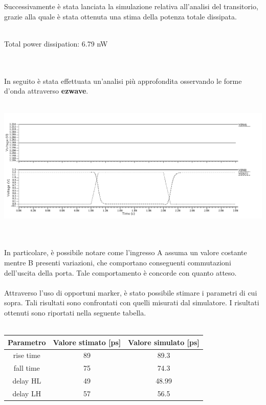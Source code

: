 \documentclass[11pt,  english, makeidx, a4paper, titlepage, oneside]{book}
\newenvironment{listato}{\footnotesize} {\normalsize }
\begin{document}
\begin{center}
\begin{listato}
	\centerline{}
\end{listato}
\end{center}
\vspace{0.3cm}
Successivamente è stata lanciata la simulazione relativa all'analisi del transitorio, grazie alla quale è stata ottenuta una stima della potenza totale dissipata.
\\\\
\centerline{Total power dissipation: 6.79 nW}
\\\\
In seguito è stata effettuata un'analisi più approfondita osservando le forme d'onda attraverso \textbf{ezwave}.
\\\\
\centerline{\includegraphics[width=14cm]{./img/Lab_5/waveform_1.png}}
\\\\
In particolare, è possibile notare come l'ingresso A assuma un valore costante mentre B presenti variazioni, che comportano conseguenti commutazioni dell'uscita della porta. Tale comportamento è concorde con quanto atteso.
\\\\
Attraverso l'uso di opportuni marker, è stato possibile stimare i parametri di cui sopra. Tali risultati sono confrontati con quelli misurati dal simulatore. I risultati ottenuti sono riportati nella seguente tabella.
\\\\
\begin{center}
	\begin{tabular}{|c|c|c|}
	\hline
	Parametro & Valore stimato [ps] & Valore simulato [ps] \\
	\hline
	 rise time & 89 &  89.3 \\
	\hline
	 fall time & 75 & 74.3 \\
	\hline
	delay HL & 49 &  48.99 \\
	\hline
	delay LH & 57  &  56.5 \\
	\hline
	\end{tabular}	
\end{center}
\end{document}

